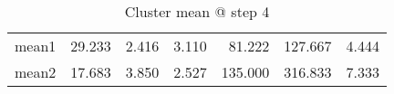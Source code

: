 \begin{table}[htbp]
  \centering
  \caption{Cluster mean @ step 4}
    \begin{tabular}{rrrrrrr}
    \toprule
    mean1 & 29.233  & 2.416  & 3.110  & 81.222  & 127.667  & 4.444  \\
    mean2 & 17.683  & 3.850  & 2.527  & 135.000  & 316.833  & 7.333  \\
    \bottomrule
    \end{tabular}%
  \label{tab:mean_a4}%
\end{table}%

